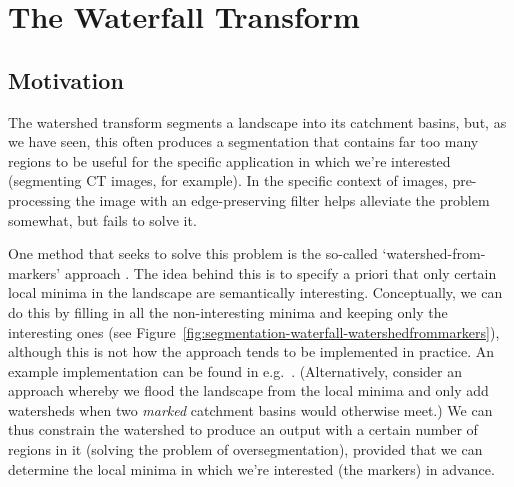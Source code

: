 \afterpage{\clearpage}

\section{The Waterfall Transform}

\subsection{Motivation}

The watershed transform segments a landscape into its catchment basins, but, as we have seen, this often produces a segmentation that contains far too many regions to be useful for the specific application in which we're interested (segmenting CT images, for example). In the specific context of images, pre-processing the image with an edge-preserving filter helps alleviate the problem somewhat, but fails to solve it.

One method that seeks to solve this problem is the so-called `watershed-from-markers' approach \cite{meyer90}. The idea behind this is to specify a priori that only certain local minima in the landscape are semantically interesting. Conceptually, we can do this by filling in all the non-interesting minima and keeping only the interesting ones (see Figure~\ref{fig:segmentation-waterfall-watershedfrommarkers}), although this is not how the approach tends to be implemented in practice. An example implementation can be found in e.g.~\cite{felkel01}. (Alternatively, consider an approach whereby we flood the landscape from the local minima and only add watersheds when two \emph{marked} catchment basins would otherwise meet.) We can thus constrain the watershed to produce an output with a certain number of regions in it (solving the problem of oversegmentation), provided that we can determine the local minima in which we're interested (the markers) in advance.


